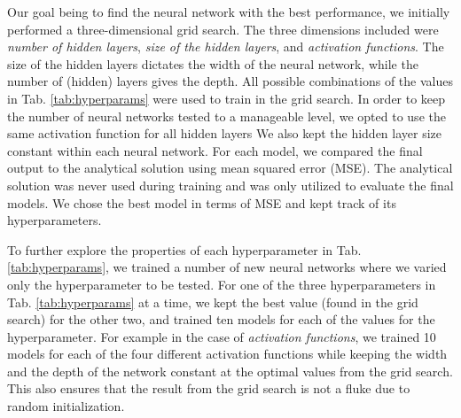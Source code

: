 Our goal being to find the neural network with the best performance, we initially performed a three-dimensional grid search.
The three dimensions included were \textit{number of hidden layers}, \textit{size of the hidden layers}, and \textit{activation functions}.
The size of the hidden layers dictates the width of the neural network, while the number of (hidden) layers gives the depth. 
All possible combinations of the values in Tab. \ref{tab:hyperparams} were used to train in the grid search.
In order to keep the number of neural networks tested to a manageable level, we opted to use the same activation function for all hidden layers
We also kept the hidden layer size constant within each neural network.
For each model, we compared the final output to the analytical solution using mean squared error (MSE).
The analytical solution was never used during training and was only utilized to evaluate the final models.
We chose the best model in terms of MSE and kept track of its hyperparameters.


To further explore the properties of each hyperparameter in Tab. \ref{tab:hyperparams}, we trained a number of new neural networks where we varied only the hyperparameter to be tested.
For one of the three hyperparameters in Tab. \ref{tab:hyperparams} at a time, we kept the best value (found in the grid search) for the other two, and trained ten models for each of the values for the hyperparameter. 
For example in the case of \textit{activation functions}, we trained 10 models for each of the four different activation functions while keeping the width and the depth of the network constant at the optimal values from the grid search.
This also ensures that the result from the grid search is not a fluke due to random initialization.


